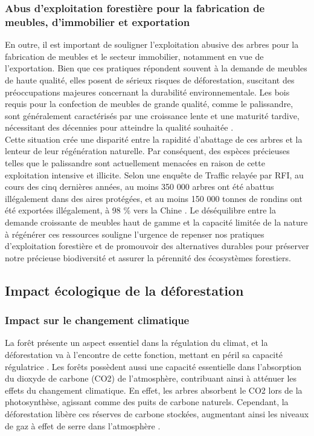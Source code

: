 \subsubsection{Abus d’exploitation forestière pour la fabrication de meubles, d’immobilier et exportation}
En outre, il est important de souligner l'exploitation abusive des arbres pour la fabrication de meubles et le secteur immobilier, notamment en vue de l'exportation. Bien que ces pratiques répondent souvent à la demande de meubles de haute qualité, elles posent de sérieux risques de déforestation, suscitant des préoccupations majeures concernant la durabilité environnementale. Les bois requis pour la confection de meubles de grande qualité, comme le palissandre, sont généralement caractérisés par une croissance lente et une maturité tardive, nécessitant des décennies pour atteindre la qualité souhaitée \cite{6}.
\\

Cette situation crée une disparité entre la rapidité d'abattage de ces arbres et la lenteur de leur régénération naturelle. Par conséquent, des espèces précieuses telles que le palissandre sont actuellement menacées en raison de cette exploitation intensive et illicite. Selon une enquête de Traffic relayée par RFI, au cours des cinq dernières années, au moins 350 000 arbres ont été abattus illégalement dans des aires protégées, et au moins 150 000 tonnes de rondins ont été exportées illégalement, à 98 \% vers la Chine \cite{7} . Le déséquilibre entre la demande croissante de meubles haut de gamme et la capacité limitée de la nature à régénérer ces ressources souligne l'urgence de repenser nos pratiques d'exploitation forestière et de promouvoir des alternatives durables pour préserver notre précieuse biodiversité et assurer la pérennité des écosystèmes forestiers.
\\

\subsection{Impact écologique de la déforestation}
\subsubsection{Impact sur le changement climatique}
La forêt présente un aspect essentiel dans la régulation du climat, et la déforestation va à l'encontre de cette fonction, mettant en péril sa capacité régulatrice \cite{8}. Les forêts possèdent aussi une capacité essentielle dans l'absorption du dioxyde de carbone (CO2) de l'atmosphère, contribuant ainsi à atténuer les effets du changement climatique. En effet, les arbres absorbent le CO2 lors de la photosynthèse, agissant comme des puits de carbone naturels. Cependant, la déforestation libère ces réserves de carbone stockées, augmentant ainsi les niveaux de gaz à effet de serre dans l'atmosphère \cite{9}. 
\\


